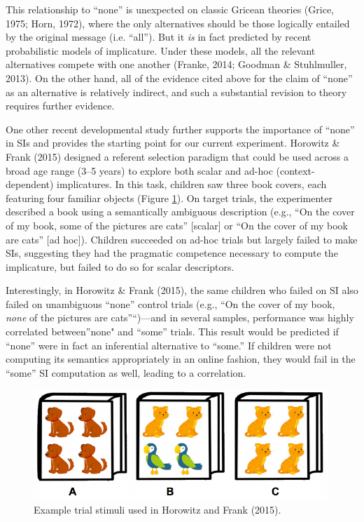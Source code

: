 \documentclass[10pt, letterpaper]{article}
\newenvironment{CodeChunk}{}{}
\begin{document}
This relationship to ``none'' is unexpected on classic Gricean theories
(Grice, 1975; Horn, 1972), where the only alternatives should be those
logically entailed by the original message (i.e. ``all''). But it
\emph{is} in fact predicted by recent probabilistic models of
implicature. Under these models, all the relevant alternatives compete
with one another (Franke, 2014; Goodman \& Stuhlmuller, 2013). On the
other hand, all of the evidence cited above for the claim of ``none'' as
an alternative is relatively indirect, and such a substantial revision
to theory requires further evidence.

One other recent developmental study further supports the importance of
``none'' in SIs and provides the starting point for our current
experiment. Horowitz \& Frank (2015) designed a referent selection
paradigm that could be used across a broad age range (3--5 years) to
explore both scalar and ad-hoc (context-dependent) implicatures. In this
task, children saw three book covers, each featuring four familiar
objects (Figure \ref{fig:image}). On target trials, the experimenter
described a book using a semantically ambiguous description (e.g., ``On
the cover of my book, some of the pictures are cats'' {[}scalar{]} or
``On the cover of my book are cats'' {[}ad hoc{]}). Children succeeded
on ad-hoc trials but largely failed to make SIs, suggesting they had the
pragmatic competence necessary to compute the implicature, but failed to
do so for scalar descriptors.

Interestingly, in Horowitz \& Frank (2015), the same children who failed
on SI also failed on unambiguous ``none'' control trials (e.g., ``On the
cover of my book, \emph{none} of the pictures are cats''``)---and in
several samples, performance was highly correlated between''none" and
``some'' trials. This result would be predicted if ``none'' were in fact
an inferential alternative to ``some.'' If children were not computing
its semantics appropriately in an online fashion, they would fail in the
``some'' SI computation as well, leading to a correlation.

\begin{CodeChunk}
\begin{figure}[b]

{\centering \includegraphics{figs/image-1} 

}

\caption[Example trial stimuli used in Horowitz and Frank (2015)]{Example trial stimuli used in Horowitz and Frank (2015).}\label{fig:image}
\end{figure}
\end{CodeChunk}
\end{document}
